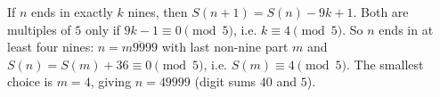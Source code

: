 If $n$ ends in exactly $k$ nines, then $S(n+1)=S(n)-9k+1$. Both are multiples of $5$ only if $9k-1\equiv0\pmod5$, i.e. $k\equiv4\pmod5$. So $n$ ends in at least four nines: $n=\overline{m9999}$ with last non-nine part $m$ and $S(n)=S(m)+36\equiv0\pmod5$, i.e. $S(m)\equiv4\pmod5$. The smallest choice is $m=4$, giving $n=\boxed{49999}$ (digit sums $40$ and $5$).
